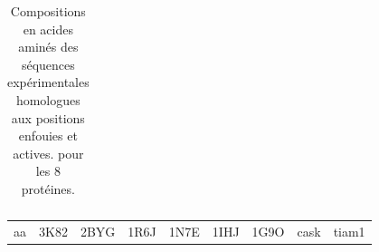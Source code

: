 \begin{table}[!htbp]
\begin{tabular}{ccccccccc}
        \bottomrule


      \end{tabular}      
      \caption{Compositions en acides aminés des séquences expérimentales homologues aux positions enfouies et actives. pour les 8 protéines.}
\label{tab:freq_AA_ALL}      
    \end{table}




    \begin{table}[!htbp]
      \centering

      \begin{tabular}{ccccccccc}

        \toprule
        aa & 3K82 & 2BYG & 1R6J & 1N7E & 1IHJ & 1G9O & cask & tiam1 \\
        \cmidrule{1-9}


\end{tabular}
\end{table}
